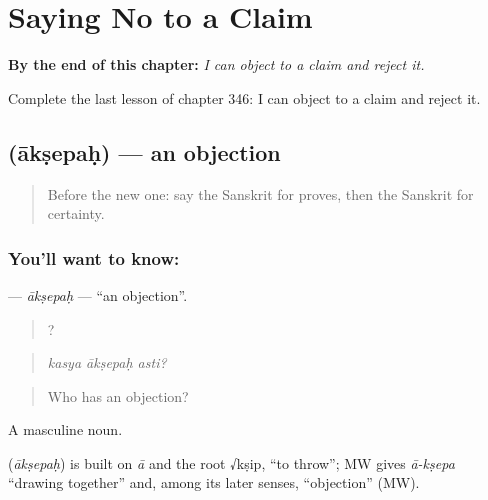 
\chapter{Saying No to a Claim}
\label{ch:sa-saying-no-to-a-claim}

\begin{chapteropening}
\textbf{By the end of this chapter:} \emph{I can object to a claim and reject it.}

Complete the last lesson of chapter 346: I can object to a claim and reject it.
\end{chapteropening}

\section[\texorpdfstring{\sk{आक्षेपः} (ākṣepaḥ)}{आक्षेपः (ākṣepaḥ)}]{ (ākṣepaḥ) — an objection}

\label{lesson:SA-C346-aksepah}



\begin{quote}
Before the new one: say the Sanskrit for proves, then the Sanskrit for certainty.
\end{quote}

\subsection*{You'll want to know: }
\textbf{} — \emph{ākṣepaḥ} — \textquotedblleft{}an objection\textquotedblright{}.

\begin{quote}
  ?
\end{quote}

\begin{quote}
\emph{kasya ākṣepaḥ asti?}
\end{quote}

\begin{quote}
Who has an objection?
\end{quote}

A masculine noun.

\begin{cousinweb}
\textbf{} (\emph{ākṣepaḥ}) is built on \emph{ā} and the root √kṣip, \textquotedblleft{}to throw\textquotedblright{}; MW gives \emph{ā-kṣepa} \textquotedblleft{}drawing together\textquotedblright{} and, among its later senses, \textquotedblleft{}objection\textquotedblright{} (MW).
\end{cousinweb}

